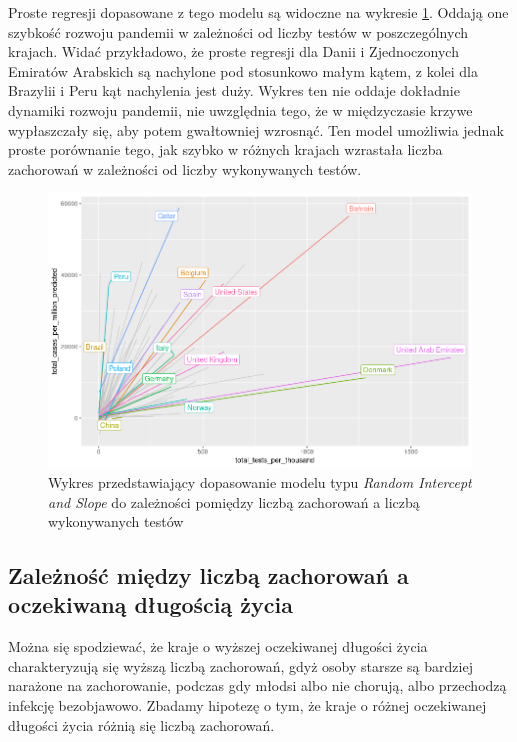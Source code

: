 \documentclass[12pt]{mwbk}
\theoremstyle{plain}
\theoremstyle{definition}
\theoremstyle{definition}
\newcommand\zrodlo[1]{\par\vspace{-3mm}{\small\textit{Źródło: }#1 }}
\begin{document}
Proste regresji dopasowane z tego modelu są widoczne na wykresie \ref{fig:mod2-slope}. Oddają one szybkość rozwoju pandemii w zależności od liczby testów w poszczególnych krajach. Widać przykładowo, że proste regresji dla Danii i Zjednoczonych Emiratów Arabskich są nachylone pod stosunkowo małym kątem, z kolei dla Brazylii i Peru kąt nachylenia jest duży. Wykres ten nie oddaje dokładnie dynamiki rozwoju pandemii, nie uwzględnia tego, że w międzyczasie krzywe wypłaszczały się, aby potem gwałtowniej wzrosnąć. Ten model umożliwia jednak proste porównanie tego, jak szybko w różnych krajach wzrastała liczba zachorowań w zależności od liczby wykonywanych testów.
\newpage
\begin{figure}[!h]
	\centering
	\includegraphics[width=\linewidth]{rys/mod2_slope_predict.png}
	\caption{Wykres przedstawiający dopasowanie modelu typu \textit{Random Intercept and Slope} do zależności pomiędzy liczbą zachorowań a liczbą wykonywanych testów}
	\label{fig:mod2-slope}
	\zrodlo{Opracowanie własne}
\end{figure}




\subsection{Zależność między liczbą zachorowań a oczekiwaną długością życia}

Można się spodziewać, że kraje o wyższej oczekiwanej długości życia charakteryzują się wyższą liczbą zachorowań, gdyż osoby starsze są bardziej narażone na zachorowanie, podczas gdy młodsi albo nie chorują, albo przechodzą infekcję bezobjawowo. Zbadamy hipotezę o tym, że kraje o różnej oczekiwanej długości życia różnią się liczbą zachorowań.
\end{document}
